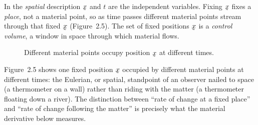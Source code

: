 In the \emph{spatial} description $\bx$ and $t$ are the independent
variables. Fixing $\bx$ fixes a \emph{place}, not a material point, so as
time passes different material points stream through that fixed $\bx$
(Figure~2.5). The set of fixed positions $\bx$ is a \emph{control volume},
a window in space through which material flows.

\begin{figure}[htbp]\centering
{}
\caption{Different material points occupy position $\bx$ at different times.}\label{fig:2.5}
\end{figure}

\begin{remark}\label{rem:fig5}
Figure~2.5 shows one fixed position $\bx$ occupied by different material
points at different times: the Eulerian, or spatial, standpoint of an
observer nailed to space (a thermometer on a wall) rather than riding with
the matter (a thermometer floating down a river). The distinction between
``rate of change at a fixed place'' and ``rate of change following the
matter'' is precisely what the material derivative below measures.
\end{remark}

